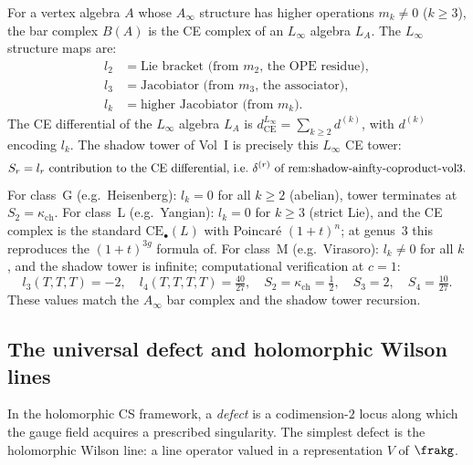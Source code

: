 \begin{remark}
\label{rem:linfinity-shadow-identification}
For a vertex algebra $A$ whose $A_\infty$ structure has higher operations $m_k \neq 0$ ($k \geq 3$), the bar complex $B(A)$ is the CE complex of an $L_\infty$ algebra $L_A$. The $L_\infty$ structure maps are:
\begin{align*}
 l_2 &= \text{Lie bracket (from } m_2\text{, the OPE residue)}, \\
 l_3 &= \text{Jacobiator (from } m_3\text{, the associator)}, \\
 l_k &= \text{higher Jacobiator (from } m_k\text{)}.
\end{align*}
The CE differential of the $L_\infty$ algebra $L_A$ is $d_{\mathrm{CE}}^{L_\infty} = \sum_{k \geq 2} d^{(k)}$, with $d^{(k)}$ encoding $l_k$. The shadow tower of Vol~I is precisely this $L_\infty$ CE tower:
\[
 S_r = l_r \text{ contribution to the CE differential, i.e.\ } \delta^{(r)} \text{ of } \textup{rem:shadow-ainfty-coproduct-vol3}.
\]
For class~G (e.g.\ Heisenberg): $l_k = 0$ for all $k \geq 2$ (abelian), tower terminates at $S_2 = \kappa_{\mathrm{ch}}$. For class~L (e.g.\ Yangian): $l_k = 0$ for $k \geq 3$ (strict Lie), and the CE complex is the standard $\mathrm{CE}_\bullet(L)$ with Poincar\'e $(1+t)^n$; at genus~$3$ this reproduces the $(1+t)^{3g}$ formula of. For class~M (e.g.\ Virasoro): $l_k \neq 0$ for all $k$, and the shadow tower is infinite; computational verification at $c = 1$:
\[
 l_3(T, T, T) = -2, \quad l_4(T, T, T, T) = \tfrac{40}{27}, \quad S_2 = \kappa_{\mathrm{ch}} = \tfrac{1}{2}, \quad S_3 = 2, \quad S_4 = \tfrac{10}{27}.
\]
These values match the $A_\infty$ bar complex and the shadow tower
recursion.
\end{remark}

\subsection{The universal defect and holomorphic Wilson lines}
\label{subsec:universal-defect}

In the holomorphic CS framework, a \emph{defect} is a codimension-$2$ locus along which the gauge field acquires a prescribed singularity. The simplest defect is the holomorphic Wilson line: a line operator valued in a representation $V$ of $\frakg$.

